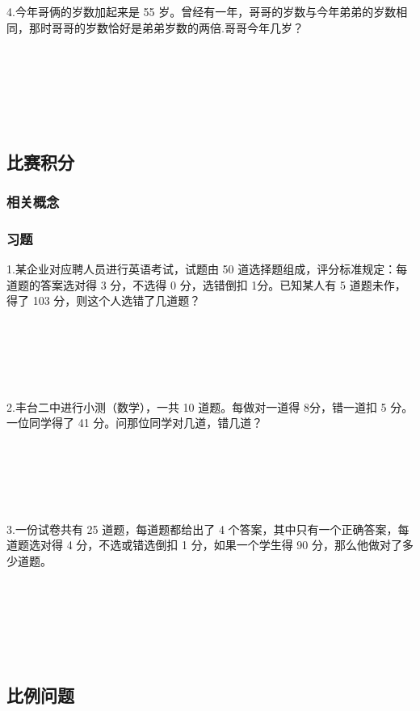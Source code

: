 \documentclass{article}
\begin{document}
~\\
~\\
~\\
~\\
~\\
4.今年哥俩的岁数加起来是 55 岁。曾经有一年，哥哥的岁数与今年弟弟的岁数相同，那时哥哥的岁数恰好是弟弟岁数的两倍.哥哥今年几岁？

~\\
~\\
~\\
~\\
~\\

\subsection{比赛积分}
\subsubsection*{相关概念}
\subsubsection*{习题}
1.某企业对应聘人员进行英语考试，试题由 50 道选择题组成，评分标准规定：每道题的答案选对得 3 分，不选得 0 分，选错倒扣 1分。已知某人有 5 道题未作，得了 103 分，则这个人选错了几道题？

~\\
~\\
~\\
~\\
~\\
2.丰台二中进行小测（数学），一共 10 道题。每做对一道得 8分，错一道扣 5 分。一位同学得了 41 分。问那位同学对几道，错几道？

~\\
~\\
~\\
~\\
~\\
3.一份试卷共有 25 道题，每道题都给出了 4 个答案，其中只有一个正确答案，每道题选对得 4 分，不选或错选倒扣 1 分，如果一个学生得 90 分，那么他做对了多少道题。

~\\
~\\
~\\
~\\
~\\
\subsection{比例问题}
\end{document}
